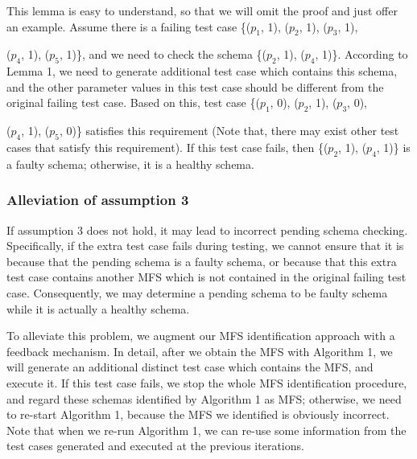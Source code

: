 \documentclass{sig-alternate-05-2015}
\begin{document}
{This lemma is easy to understand, so that we will omit the proof and just offer an example. Assume there is a failing test case \{($p_{1}$, 1), ($p_{2}$, 1), ($p_{3}$, 1), {($p_{4}$, 1), ($p_{5}$, 1)\}, and we need to check the schema \{($p_{2}$, 1), ($p_{4}$, 1)\}. According to Lemma 1, we need to generate additional test case which contains this schema, and the other parameter values in this test case should be different from the original failing test case. Based on this, test case \{($p_{1}$, 0), ($p_{2}$, 1), ($p_{3}$, 0), {($p_{4}$, 1), ($p_{5}$, 0)\} satisfies this requirement (Note that, there may exist other test cases that satisfy this requirement). If this test case fails, then \{($p_{2}$, 1), ($p_{4}$, 1)\} is a faulty schema; otherwise, it is a healthy schema.

\subsubsection{Alleviation of assumption 3}

If assumption 3 does not hold, it may lead to incorrect pending schema checking. Specifically, if the extra test case fails during testing, we cannot ensure that it is because that the pending schema is a faulty schema, or because that this extra test case contains another MFS which is not contained in the original failing test case. Consequently, we may determine a pending schema to be faulty schema while it is actually a healthy schema.

To alleviate this problem, we augment our MFS identification approach with a feedback mechanism. In detail, after we obtain the MFS with Algorithm 1, we will generate an additional distinct test case which contains the MFS, and execute it. If this test case fails, we stop the whole MFS identification procedure, and regard these schemas identified by Algorithm 1 as MFS; otherwise, we need to re-start Algorithm 1, because the MFS we identified is obviously incorrect. Note that when we re-run Algorithm 1, we can re-use some information from the test cases generated and executed at the previous iterations.

%

}}}
\end{document}
